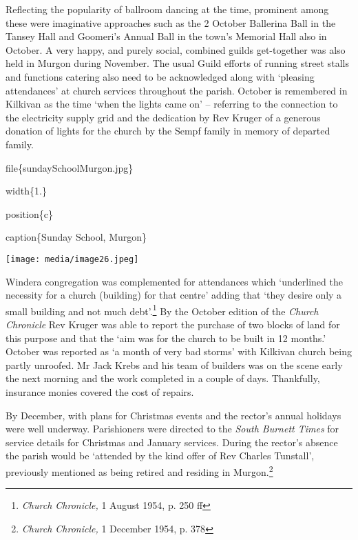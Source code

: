 Reflecting the popularity of ballroom dancing at the time, prominent among these were imaginative approaches such as the 2 October Ballerina Ball in the Tansey Hall and Goomeri's Annual Ball in the town's Memorial Hall also in October. A very happy, and purely social, combined guilds get-together was also held in Murgon during November. The usual Guild efforts of running street stalls and functions catering also need to be acknowledged along with `pleasing attendances' at church services throughout the parish. October is remembered in Kilkivan as the time `when the lights came on' -- referring to the connection to the electricity supply grid and the dedication by Rev Kruger of a generous donation of lights for the church by the Sempf family in memory of departed family.

file\{sundaySchoolMurgon.jpg\}

width\{1.\}

position\{c\}

caption\{Sunday School, Murgon\}

\texttt{[image: media/image26.jpeg]}

Windera congregation was complemented for attendances which `underlined the necessity for a church (building) for that centre' adding that `they desire only a small building and not much debt'.\footnote{\emph{Church Chronicle,} 1 August 1954, p. 250 ff} By the October edition of the \emph{Church Chronicle} Rev Kruger was able to report the purchase of two blocks of land for this purpose and that the `aim was for the church to be built in 12 months.' October was reported as `a month of very bad storms' with Kilkivan church being partly unroofed. Mr Jack Krebs and his team of builders was on the scene early the next morning and the work completed in a couple of days. Thankfully, insurance monies covered the cost of repairs.

By December, with plans for Christmas events and the rector's annual holidays were well underway. Parishioners were directed to the \emph{South Burnett Times} for service details for Christmas and January services. During the rector's absence the parish would be `attended by the kind offer of Rev Charles Tunstall', previously mentioned as being retired and residing in Murgon.\footnote{\emph{Church Chronicle,} 1 December 1954, p. 378}

